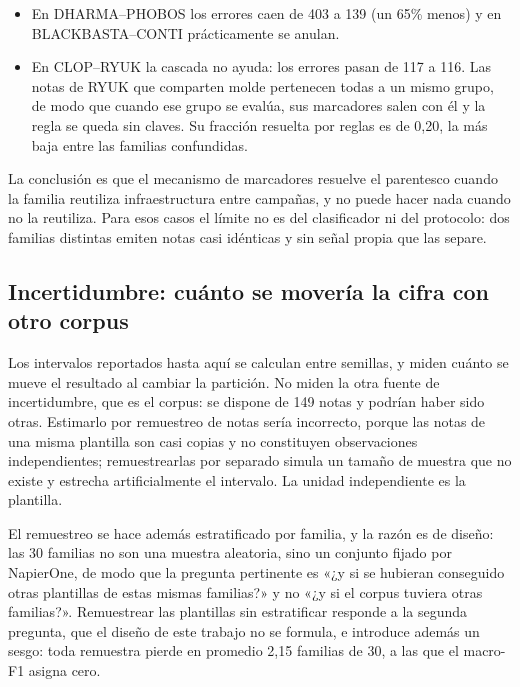 \begin{itemize}
  \item En DHARMA--PHOBOS los errores caen de 403 a 139 (un 65\% menos) y en BLACKBASTA--CONTI prácticamente se anulan.
  \item En CLOP--RYUK la cascada no ayuda: los errores pasan de 117 a 116. Las notas de RYUK que comparten molde pertenecen todas a un mismo grupo, de modo que cuando ese grupo se evalúa, sus marcadores salen con él y la regla se queda sin claves. Su fracción resuelta por reglas es de 0,20, la más baja entre las familias confundidas.
\end{itemize}

La conclusión es que el mecanismo de marcadores resuelve el parentesco cuando la familia reutiliza infraestructura entre campañas, y no puede hacer nada cuando no la reutiliza. Para esos casos el límite no es del clasificador ni del protocolo: dos familias distintas emiten notas casi idénticas y sin señal propia que las separe.



\subsection{Incertidumbre: cuánto se movería la cifra con otro corpus}
\label{subsec:res_ic_plantilla}

Los intervalos reportados hasta aquí se calculan entre semillas, y miden cuánto se mueve el resultado al cambiar la partición. No miden la otra fuente de incertidumbre, que es el corpus: se dispone de 149 notas y podrían haber sido otras. Estimarlo por remuestreo de notas sería incorrecto, porque las notas de una misma plantilla son casi copias y no constituyen observaciones independientes; remuestrearlas por separado simula un tamaño de muestra que no existe y estrecha artificialmente el intervalo. La unidad independiente es la plantilla.

El remuestreo se hace además estratificado por familia, y la razón es de diseño: las 30 familias no son una muestra aleatoria, sino un conjunto fijado por NapierOne, de modo que la pregunta pertinente es «¿y si se hubieran conseguido otras plantillas de estas mismas familias?» y no «¿y si el corpus tuviera otras familias?». Remuestrear las plantillas sin estratificar responde a la segunda pregunta, que el diseño de este trabajo no se formula, e introduce además un sesgo: toda remuestra pierde en promedio 2,15 familias de 30, a las que el macro-F1 asigna cero.

